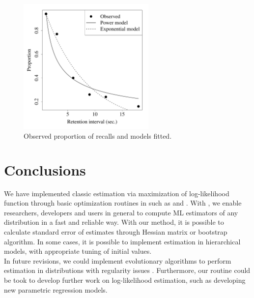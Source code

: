\documentclass[nojss]{jss}
\begin{document}
\begin{figure}[H]
\centering
  \includegraphics[width=0.6\textwidth]{article-RetentionPlot}
  \caption{\label{fig:forgetting} Observed proportion of recalls and models fitted.}
\end{figure}


\section{Conclusions} \label{sec:conclussions}

We have implemented classic estimation via maximization of log-likelihood function through basic optimization routines in  such as  and . With , we enable researchers, developers and users in general to compute ML estimators of any distribution in a fast and reliable way. With our  method, it is possible to calculate standard error of estimates through Hessian matrix or bootstrap algorithm. In some cases, it is possible to implement estimation in hierarchical models, with appropriate tuning of initial values. \\

In future revisions, we could implement evolutionary algorithms to perform estimation in distributions with regularity issues \citep{Haupt2003}. Furthermore, our routine could be took to develop further work on log-likelihood estimation, such as developing new parametric regression models.



\end{document}
